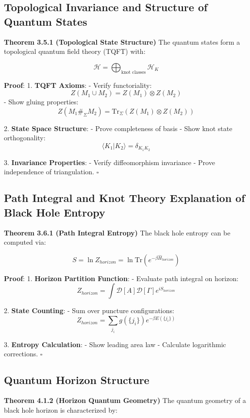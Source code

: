 \documentclass[12pt,a4paper]{article}
\begin{document}
\subsection{Topological Invariance and Structure of Quantum States}

\textbf{Theorem 3.5.1 (Topological State Structure)}
The quantum states form a topological quantum field theory (TQFT) with:

\[
\mathcal{H} = \bigoplus_{\text{knot classes}} \mathcal{H}_K
\]

\textbf{Proof}:
1. \textbf{TQFT Axioms}:
   - Verify functoriality:
     \[
     Z(M_1 \cup M_2) = Z(M_1) \otimes Z(M_2)
     \]
   - Show gluing properties:
     \[
     Z(M_1 \#_\Sigma M_2) = \text{Tr}_\Sigma(Z(M_1) \otimes Z(M_2))
     \]

2. \textbf{State Space Structure}:
   - Prove completeness of basis
   - Show knot state orthogonality:
     \[
     \langle K_1|K_2\rangle = \delta_{K_1K_2}
     \]

3. \textbf{Invariance Properties}:
   - Verify diffeomorphism invariance
   - Prove independence of triangulation. $\square$

\subsection{Path Integral and Knot Theory Explanation of Black Hole Entropy}

\textbf{Theorem 3.6.1 (Path Integral Entropy)}
The black hole entropy can be computed via:

\[
S = \ln Z_{horizon} = \ln \text{Tr}(e^{-\beta\hat{H}_{horizon}})
\]

\textbf{Proof}:
1. \textbf{Horizon Partition Function}:
   - Evaluate path integral on horizon:
     \[
     Z_{horizon} = \int \mathcal{D}[A]\mathcal{D}[\Gamma] e^{iS_{horizon}}
     \]
   
2. \textbf{State Counting}:
   - Sum over puncture configurations:
     \[
     Z_{horizon} = \sum_{j_i} g(\{j_i\})e^{-\beta E(\{j_i\})}
     \]

3. \textbf{Entropy Calculation}:
   - Show leading area law
   - Calculate logarithmic corrections. $\square$

\subsection{Quantum Horizon Structure}

\textbf{Theorem 4.1.2 (Horizon Quantum Geometry)}
The quantum geometry of a black hole horizon is characterized by:
\end{document}
